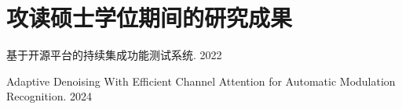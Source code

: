 \chapter{攻读硕士学位期间的研究成果}


\begin{enumerate}[label = {[\arabic*]}]
    \item 基于开源平台的持续集成功能测试系统. 2022
    \item Adaptive Denoising With Efficient Channel Attention for Automatic Modulation Recognition. 2024
\end{enumerate}






